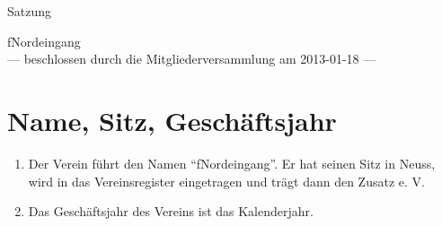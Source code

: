 \documentclass[ngerman]{scrartcl}
\begin{document}
\renewcommand*{\othersectionlevelsformat}[3]{\S#3\autodot\enskip}
\begin{titlepage}
\centerline{\Large Satzung}
\begin{center}
{\Huge fNordeingang}\\[5mm]
\vfill
--- beschlossen durch die Mitgliederversammlung am 2013-01-18 ---
\end{center}
\end{titlepage}
\section{Name, Sitz, Geschäftsjahr} \label{sec:name_sitz_geschaeftsjahr}
\begin{enumerate}
 \item Der Verein führt den Namen "`fNordeingang"'. Er hat
 seinen Sitz in Neuss, wird in das Vereinsregister
 eingetragen und trägt dann den Zusatz e. V.
 \item Das Geschäftsjahr des Vereins ist das Kalenderjahr.
\end{enumerate}
\end{document}
